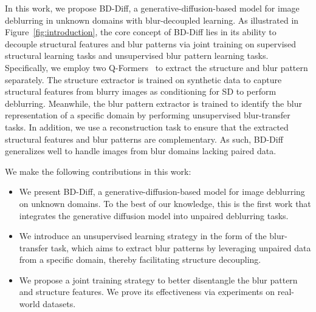 In this work, we propose BD-Diff, a generative-diffusion-based model for image deblurring in unknown domains with blur-decoupled learning. As illustrated in Figure~\ref{fig:introduction}, the core concept of BD-Diff lies in its ability to decouple structural features and blur patterns via joint training on supervised structural learning tasks and unsupervised blur pattern learning tasks. 
Specifically, we employ two Q-Formers~\cite{li2023blip} to extract the structure and blur pattern separately. 
The structure extractor is trained on synthetic data to capture structural features from blurry images as conditioning for SD to perform deblurring. Meanwhile, the blur pattern extractor is trained to identify the blur representation of a specific domain by performing unsupervised blur-transfer tasks. 
In addition, we use a reconstruction task to ensure that the extracted structural features and blur patterns are complementary. As such, BD-Diff generalizes well to handle images from blur domains lacking paired data.

We make the following contributions in this work:
\begin{itemize}
    \item We present BD-Diff, a generative-diffusion-based model for image deblurring on unknown domains. To the best of our knowledge, this is the first work that integrates the generative diffusion model into unpaired deblurring tasks.
    \item We introduce an unsupervised learning strategy in the form of the blur-transfer task, which aims to extract blur patterns by leveraging unpaired data from a specific domain, thereby facilitating structure decoupling.
    \item We propose a joint training strategy to better disentangle the blur pattern and structure features. We prove its effectiveness via experiments on real-world datasets.
\end{itemize}